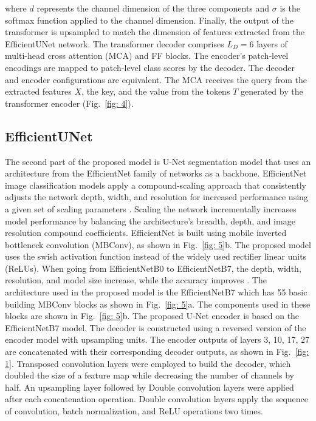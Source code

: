\documentclass[journal]{IEEEtran}
\begin{document}
where $d$ represents the channel dimension of the three components and $\sigma$ is the softmax function applied to the channel dimension. Finally, the output of the transformer is upsampled to match the dimension of features extracted from the EfficientUNet network. 
The transformer decoder comprises $L_D=6$ layers of multi-head cross attention (MCA) and FF blocks. The encoder's patch-level encodings are mapped to patch-level class scores by the decoder. The decoder and encoder configurations are equivalent. The MCA receives the query from the extracted features $X$, the key, and the value from the tokens $T$ generated by the transformer encoder (Fig.~\ref{fig: 4}).  
\subsection{EfficientUNet}
The second part of the proposed model is U-Net segmentation model that uses an architecture from the EfficientNet family of networks as a backbone. EfficientNet image classification models apply a compound-scaling approach that consistently adjusts the network depth, width, and resolution for increased performance using a given set of scaling parameters \cite{pmlr-v97-tan19a}. Scaling the network incrementally increases model performance by balancing the architecture's breadth, depth, and image resolution compound coefficients. EfficientNet is built using mobile inverted bottleneck convolution (MBConv), as shown in Fig.~\ref{fig: 5}b. The proposed model uses the swish activation function \cite{Sandler_2018_CVPR} instead of the widely used rectifier linear units (ReLUs). When going from EfficientNetB0 to EfficientNetB7, the depth, width, resolution, and model size increase, while the accuracy improves \cite{pmlr-v97-tan19a}. The architecture used in the proposed model is the EfficientNetB7 which has 55 basic building MBConv blocks as shown in Fig.~\ref{fig: 5}a. The components used in these blocks are shown in Fig.~\ref{fig: 5}b.
The proposed U-Net encoder is based on the EfficientNetB7 model. The decoder is constructed using a reversed version of the encoder model with upsampling units. The encoder outputs of layers 3, 10, 17, 27 are concatenated with their corresponding decoder outputs, as shown in Fig.~\ref{fig: 1}. Transposed convolution layers were employed to build the decoder, which doubled the size of a feature map while decreasing the number of channels by half. An upsampling layer followed by Double convolution layers were applied after each concatenation operation. Double convolution layers apply the sequence of convolution, batch normalization, and ReLU operations two times. 
\end{document}
